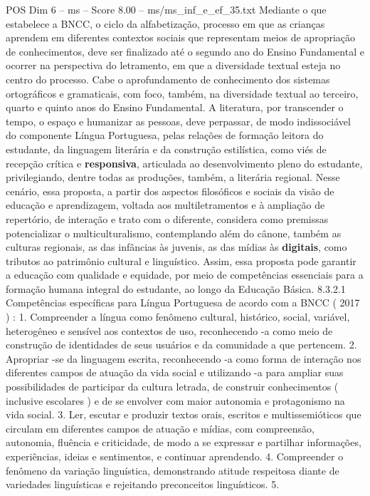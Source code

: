 \begin{textsample}{POS Dim 6 – ms – Score 8.00 – ms/ms\_inf\_e\_ef\_35.txt}
Mediante o que estabelece a BNCC, o ciclo da alfabetização, processo em que as crianças aprendem em diferentes contextos sociais que representam meios de apropriação de conhecimentos, deve ser finalizado até o segundo ano do Ensino Fundamental e ocorrer na perspectiva do letramento, em que a diversidade textual esteja no centro do processo.
Cabe o aprofundamento de conhecimento dos sistemas ortográficos e gramaticais, com foco, também, na diversidade textual ao terceiro, quarto e quinto anos do Ensino Fundamental.
A literatura, por transcender o tempo, o espaço e humanizar as pessoas, deve perpassar, de modo indissociável do componente Língua Portuguesa, pelas relações de formação leitora do estudante, da linguagem literária e da construção estilística, como viés de recepção crítica e \textbf{responsiva}, articulada ao desenvolvimento pleno do estudante, privilegiando, dentre todas as produções, também, a literária regional.
Nesse cenário, essa proposta, a partir dos aspectos filosóficos e sociais da visão de educação e aprendizagem, voltada aos multiletramentos e à ampliação de repertório, de interação e trato com o diferente, considera como premissas potencializar o multiculturalismo, contemplando além do cânone, também as culturas regionais, as das infâncias às juvenis, as das mídias às \textbf{digitais}, como tributos ao patrimônio cultural e linguístico.
Assim, essa proposta pode garantir a educação com qualidade e equidade, por meio de competências essenciais para a formação humana integral do estudante, ao longo da Educação Básica. 8.3.2.1 Competências específicas para Língua Portuguesa de acordo com a BNCC ( 2017 ) : 1.
Compreender a língua como fenômeno cultural, histórico, social, variável, heterogêneo e sensível aos contextos de uso, reconhecendo -a como meio de construção de identidades de seus usuários e da comunidade a que pertencem. 2.
Apropriar -se da linguagem escrita, reconhecendo -a como forma de interação nos diferentes campos de atuação da vida social e utilizando -a para ampliar suas possibilidades de participar da cultura letrada, de construir conhecimentos ( inclusive escolares ) e de se envolver com maior autonomia e protagonismo na vida social. 3.
Ler, escutar e produzir textos orais, escritos e multissemióticos que circulam em diferentes campos de atuação e mídias, com compreensão, autonomia, fluência e criticidade, de modo a se expressar e partilhar informações, experiências, ideias e sentimentos, e continuar aprendendo. 4.
Compreender o fenômeno da variação linguística, demonstrando atitude respeitosa diante de variedades linguísticas e rejeitando preconceitos linguísticos. 5.

\end{textsample}
